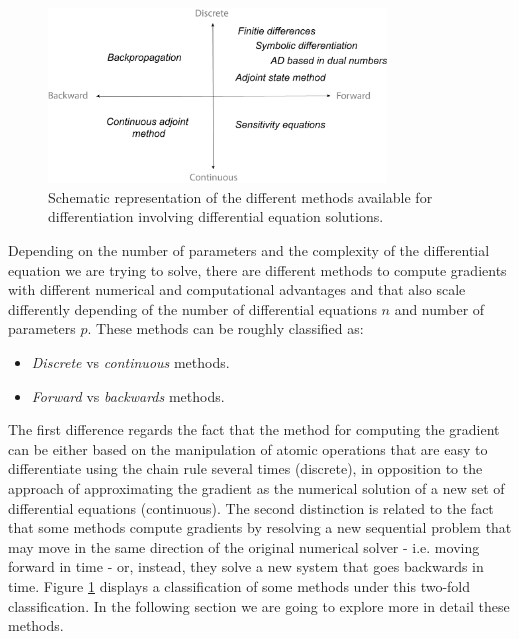\begin{figure}[]
    \centering
    \includegraphics[width=0.80\textwidth]{figures/scheme-methods.png}
    \caption{Schematic representation of the different methods available for differentiation involving differential equation solutions.}
    \label{fig:diff}
\end{figure}
Depending on the number of parameters and the complexity of the differential equation we are trying to solve, there are different methods to compute gradients with different numerical and computational advantages and that also scale differently depending of the number of differential equations $n$ and number of parameters $p$. 
These methods can be roughly classified as:
\begin{itemize}
    \item \textit{Discrete} vs \textit{continuous} methods.
    \item \textit{Forward} vs \textit{backwards} methods.
\end{itemize}
The first difference regards the fact that the method for computing the gradient can be either based on the manipulation of atomic operations that are easy to differentiate using the chain rule several times (discrete), in opposition to the approach of approximating the gradient as the numerical solution of a new set of differential equations (continuous). 
The second distinction is related to the fact that some methods compute gradients by resolving a new sequential problem that may move in the same direction of the original numerical solver - i.e. moving forward in time - or, instead, they solve a new system that goes backwards in time. 
Figure \ref{fig:diff} displays a classification of some methods under this two-fold classification. In the following section we are going to explore more in detail these methods.